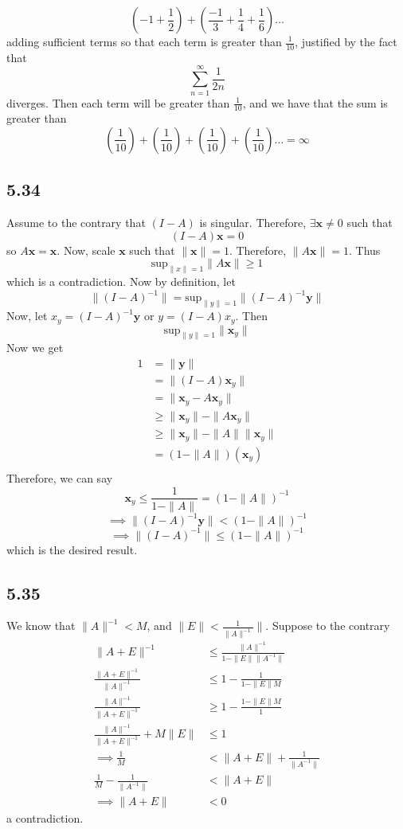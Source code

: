 \documentclass[letterpaper,12pt]{article}
\theoremstyle{definition}
\begin{document}
\[\left(-1 + \frac{1}{2}\right) + \left(\frac{-1}{3} + \frac{1}{4} + \frac{1}{6}\right)\dots\]
adding sufficient terms so that each term is greater than $\frac{1}{10}$, justified by the fact that
\[\sum^\infty_{n=1}\frac{1}{2n} \] 
diverges. Then each term will be greater than $\frac{1}{10}$, and we have that the sum is greater than
\[\left(\frac{1}{10}\right) + \left(\frac{1}{10}\right) + \left(\frac{1}{10}\right) + \left(\frac{1}{10}\right) \dots = \infty\]



\subsection*{5.34}
Assume to the contrary that $(I-A)$ is singular. Therefore, $\exists \textbf{x} \neq 0 $ such that
\[(I-A) \textbf{x} = 0\]
so $A \textbf{x} = \textbf{x}$. Now, scale $ \textbf{x} $ such that $\| \textbf{x} \| = 1 $. Therefore, $\|A \textbf{x} \| = 1  $. Thus 
\[\text{sup}_{\|x\| = 1} \|A \textbf{x}\| \geq 1\]
which is a contradiction. Now by definition, let
\[ \|(I - A)^{-1} \| = \text{sup}_{\|y\| =1}  \|(I-A)^{-1} \textbf{y} \| \]
Now, let $x_y = (I-A)^{-1} \textbf{y} $ or $y = (I-A) x_y$. Then 
\[ \text{sup}_{\|y\| = 1} \| \textbf{x}_y  \|\]
Now we get 
\begin{align*}
    1 &= \| \textbf{y} \| \\ 
    &= \| (I-A) \textbf{x}_y  \| \\ 
    &= \| \textbf{x}_y - A \textbf{x}_y  \| \\ 
    &\geq \| \textbf{x}_y\| - \|A \textbf{x}_y  \| \\ 
    &\geq \| \textbf{x}_y\| - \|A\|\| \textbf{x}_y  \| \\ 
    &= ( 1 - \|A\|)( \textbf{x}_y )  \\ 
\end{align*}
Therefore, we can say
\[ \textbf{x}_y \leq \frac{1}{1 - \|A\|} = (1 - \|A\|)^{-1} \]
\[\implies \|(I-A)^{-1} \textbf{y} \|  < (1-\|A\|)^{-1} \]
\[ \implies \|(I-A)^{-1} \|\leq (1-\|A\|)^{-1}\]
which is the desired result.

\subsection*{5.35}
We know that $\|A\|^{-1} < M$, and $\|E\|< \frac{1}{\|A\|^{-1}}\|$. Suppose to the contrary
\begin{align*}
    \|A+E\|^{-1} &\leq \frac{\|A\|^{-1}}{1-\|E\| \|A^{-1}\|} \\
    \frac{\|A+E\|^{-1}}{\|A\|^{-1}} &\leq 1- \frac{1}{1-\|E\| M} \\
    \frac{\|A\|^{-1}}{\|A+E\|^{-1}}&\geq 1- \frac{1-\|E\| M}{1}\\
    \frac{\|A\|^{-1}}{\|A+E\|^{-1}} + M \|E\| &\leq 1 \\
   \implies  \frac{1}{M} &< \|A+E\| + \frac{1}{\|A^{-1}\|} \\
    \frac{1}{M} - \frac{1}{\|A^{-1}\|} &< \|A+E\|\\
    \implies 
    \|A+E\| &< 0
\end{align*}
a contradiction.
\end{document}
